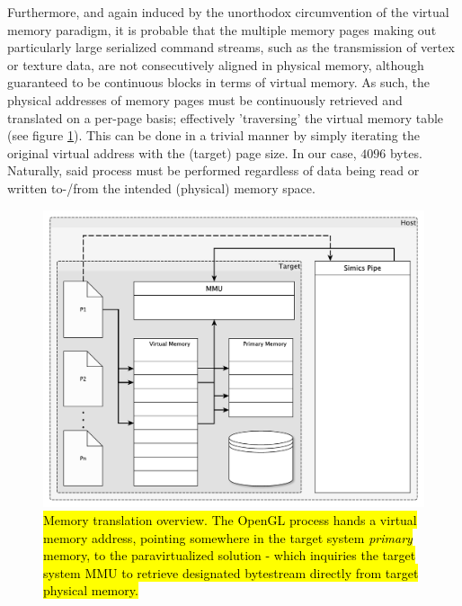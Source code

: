 Furthermore, and again induced by the unorthodox circumvention of the virtual memory paradigm, it is probable that the multiple memory pages making out particularly large serialized command streams, such as the transmission of vertex or texture data, are not consecutively aligned in physical memory, although guaranteed to be continuous blocks in terms of virtual memory.
As such, the physical addresses of memory pages must be continuously retrieved and translated on a per-page basis; effectively 'traversing' the virtual memory table (see figure \ref{fig:virtualmemory}).
This can be done in a trivial manner by simply iterating the original virtual address with the (target) page size.
In our case, $4096$ bytes.
Naturally, said process must be performed regardless of data being read or written to-/from the intended (physical) memory space.

\begin{figure}
\centering
\includegraphics[width=\linewidth]{img/yedvirtualmemory.pdf}
\caption[Memory translation overview]{\hl{Memory translation overview. The OpenGL process hands a virtual memory address, pointing somewhere in the target system \textit{primary} memory, to the paravirtualized solution - which inquiries the target system MMU to retrieve designated bytestream directly from target physical memory.}}
\label{fig:virtualmemory}
\end{figure}

